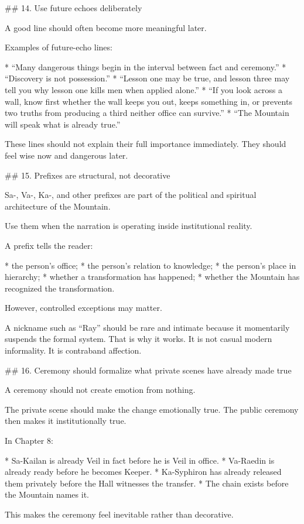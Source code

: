 ## 14. Use future echoes deliberately

A good line should often become more meaningful later.

Examples of future-echo lines:

* “Many dangerous things begin in the interval between fact and ceremony.”
* “Discovery is not possession.”
* “Lesson one may be true, and lesson three may tell you why lesson one kills men when applied alone.”
* “If you look across a wall, know first whether the wall keeps you out, keeps something in, or prevents two truths from producing a third neither office can survive.”
* “The Mountain will speak what is already true.”

These lines should not explain their full importance immediately. They should feel wise now and dangerous later.

## 15. Prefixes are structural, not decorative

Sa-, Va-, Ka-, and other prefixes are part of the political and spiritual architecture of the Mountain.

Use them when the narration is operating inside institutional reality.

A prefix tells the reader:

* the person’s office;
* the person’s relation to knowledge;
* the person’s place in hierarchy;
* whether a transformation has happened;
* whether the Mountain has recognized the transformation.

However, controlled exceptions may matter.

A nickname such as “Ray” should be rare and intimate because it momentarily suspends the formal system. That is why it works. It is not casual modern informality. It is contraband affection.

## 16. Ceremony should formalize what private scenes have already made true

A ceremony should not create emotion from nothing.

The private scene should make the change emotionally true. The public ceremony then makes it institutionally true.

In Chapter 8:

* Sa-Kailan is already Veil in fact before he is Veil in office.
* Va-Raedin is already ready before he becomes Keeper.
* Ka-Syphiron has already released them privately before the Hall witnesses the transfer.
* The chain exists before the Mountain names it.

This makes the ceremony feel inevitable rather than decorative.

